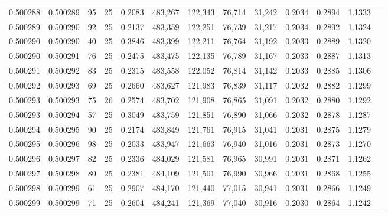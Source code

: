 \begin{tabular}{rrrrrrrrrrrrr}
0.500288 & 0.500289 &  95 &  25 &                                     0.2083 & 483,267 & 122,343 &  76,714 &  31,242 & 0.2034 & 0.2894 & 1.1333 \\
0.500289 & 0.500290 &  92 &  25 &                                     0.2137 & 483,359 & 122,251 &  76,739 &  31,217 & 0.2034 & 0.2892 & 1.1324 \\
0.500290 & 0.500290 &  40 &  25 &                                     0.3846 & 483,399 & 122,211 &  76,764 &  31,192 & 0.2033 & 0.2889 & 1.1320 \\
0.500290 & 0.500291 &  76 &  25 &                                     0.2475 & 483,475 & 122,135 &  76,789 &  31,167 & 0.2033 & 0.2887 & 1.1313 \\
0.500291 & 0.500292 &  83 &  25 &                                     0.2315 & 483,558 & 122,052 &  76,814 &  31,142 & 0.2033 & 0.2885 & 1.1306 \\
0.500292 & 0.500293 &  69 &  25 &                                     0.2660 & 483,627 & 121,983 &  76,839 &  31,117 & 0.2032 & 0.2882 & 1.1299 \\
0.500293 & 0.500293 &  75 &  26 &                                     0.2574 & 483,702 & 121,908 &  76,865 &  31,091 & 0.2032 & 0.2880 & 1.1292 \\
0.500293 & 0.500294 &  57 &  25 &                                     0.3049 & 483,759 & 121,851 &  76,890 &  31,066 & 0.2032 & 0.2878 & 1.1287 \\
0.500294 & 0.500295 &  90 &  25 &                                     0.2174 & 483,849 & 121,761 &  76,915 &  31,041 & 0.2031 & 0.2875 & 1.1279 \\
0.500295 & 0.500296 &  98 &  25 &                                     0.2033 & 483,947 & 121,663 &  76,940 &  31,016 & 0.2031 & 0.2873 & 1.1270 \\
0.500296 & 0.500297 &  82 &  25 &                                     0.2336 & 484,029 & 121,581 &  76,965 &  30,991 & 0.2031 & 0.2871 & 1.1262 \\
0.500297 & 0.500298 &  80 &  25 &                                     0.2381 & 484,109 & 121,501 &  76,990 &  30,966 & 0.2031 & 0.2868 & 1.1255 \\
0.500298 & 0.500299 &  61 &  25 &                                     0.2907 & 484,170 & 121,440 &  77,015 &  30,941 & 0.2031 & 0.2866 & 1.1249 \\
0.500299 & 0.500299 &  71 &  25 &                                     0.2604 & 484,241 & 121,369 &  77,040 &  30,916 & 0.2030 & 0.2864 & 1.1242 \\

\end{tabular}
